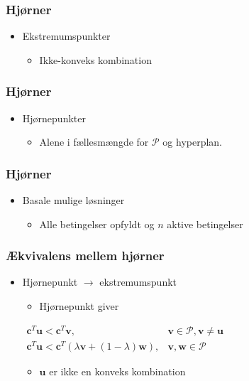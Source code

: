 %
\begin{frame}
\frametitle{Hjørner}
\begin{itemize}
\item Ekstremumspunkter
\begin{itemize}
\item Ikke-konveks kombination
\end{itemize}
\end{itemize}
%

\end{frame}
%
%
\begin{frame}
\frametitle{Hjørner}
\begin{itemize}
\item Hjørnepunkter
\begin{itemize}
\item Alene i fællesmængde for $\mathcal{P}$ og hyperplan.
\end{itemize}
\end{itemize}
%

\end{frame}
%
%
\begin{frame}
\frametitle{Hjørner}
\begin{itemize}
\item Basale mulige løsninger
\begin{itemize}
\item Alle betingelser opfyldt og $n$ aktive betingelser
\end{itemize}
\end{itemize}
%

\end{frame}
%
%
\begin{frame}
\frametitle{Ækvivalens mellem hjørner}
\begin{itemize}
\item Hjørnepunkt $\rightarrow$ ekstremumspunkt
\begin{itemize}
%
\item Hjørnepunkt giver
\end{itemize}
%
\centering
$
\begin{array}{ll}
\textbf{c}^T\textbf{u} < \textbf{c}^T\textbf{v}, &\textbf{v}\in \mathcal{P}, \textbf{v} \neq \textbf{u}\\
\textbf{c}^T\textbf{u} < \textbf{c}^T(\lambda\textbf{v} + (1-\lambda)\textbf{w}), &\textbf{v},\textbf{w} \in \mathcal{P}
\end{array}
$
%
\begin{itemize}
\item $\textbf{u}$ er ikke en konveks kombination
\end{itemize}
\end{itemize}
%
\end{frame}
